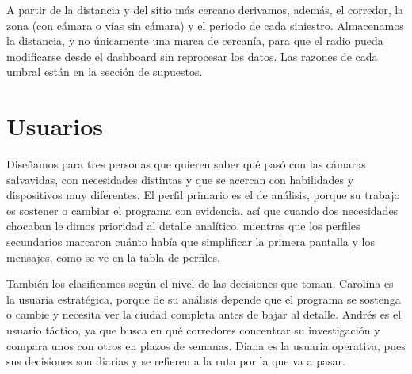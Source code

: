\documentclass[10pt,a4paper]{article}
\begin{document}
A partir de la distancia y del sitio más cercano derivamos, además, el corredor, la zona (con cámara o vías sin cámara) y el periodo de cada siniestro. Almacenamos la distancia, y no únicamente una marca de cercanía, para que el radio pueda modificarse desde el dashboard sin reprocesar los datos. Las razones de cada umbral están en la sección de supuestos.

\FloatBarrier
\section{Usuarios}

Diseñamos para tres personas que quieren saber qué pasó con las cámaras salvavidas, con necesidades distintas y que se acercan con habilidades y dispositivos muy diferentes. El perfil primario es el de análisis, porque su trabajo es sostener o cambiar el programa con evidencia, así que cuando dos necesidades chocaban le dimos prioridad al detalle analítico, mientras que los perfiles secundarios marcaron cuánto había que simplificar la primera pantalla y los mensajes, como se ve en la tabla de perfiles.

También los clasificamos según el nivel de las decisiones que toman. Carolina es la usuaria estratégica, porque de su análisis depende que el programa se sostenga o cambie y necesita ver la ciudad completa antes de bajar al detalle. Andrés es el usuario táctico, ya que busca en qué corredores concentrar su investigación y compara unos con otros en plazos de semanas. Diana es la usuaria operativa, pues sus decisiones son diarias y se refieren a la ruta por la que va a pasar.
\end{document}
